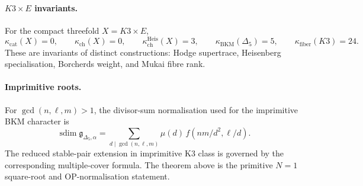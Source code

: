 \paragraph{\texorpdfstring{\(K3\times E\)}{K3 x E} invariants.}
For the compact threefold \(X=K3\times E\),
\[
  \kappa_{\mathrm{cat}}(X)=0,\qquad
  \kappa_{\mathrm{ch}}(X)=0,\qquad
  \kappa_{\mathrm{ch}}^{\mathrm{Heis}}(X)=3,\qquad
  \kappa_{\mathrm{BKM}}(\Delta_5)=5,\qquad
  \kappa_{\mathrm{fiber}}(K3)=24.
\]
These are invariants of distinct constructions: Hodge supertrace,
Heisenberg specialisation, Borcherds weight, and Mukai fibre rank.

\paragraph{Imprimitive roots.}
For \(\gcd(n,\ell,m)>1\), the divisor-sum normalisation used for the
imprimitive BKM character is
\[
  \operatorname{sdim}\mathfrak g_{\Delta_5,\alpha}
  =
  \sum_{d\mid\gcd(n,\ell,m)}
  \mu(d)\,f(nm/d^2,\ell/d).
\]
The reduced stable-pair extension in imprimitive K3 class is governed
by the corresponding multiple-cover formula.  The theorem above is the
primitive \(N=1\) square-root and OP-normalisation statement.
